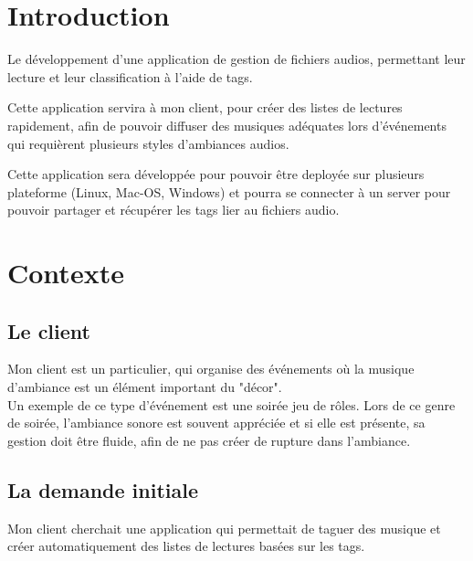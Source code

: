 \documentclass[a4paper,12pt]{report}
\author{Thomas Stassin}
\date{}
\begin{document}


\newpage
\thispagestyle{empty}
\addtocounter{page}{-1}
\null
\newpage



\tableofcontents
\pagebreak

\chapter{Introduction}

Le développement d'une application de gestion de fichiers audios, permettant leur lecture et leur classification à l'aide de tags.

Cette application servira à mon client, pour créer des listes de lectures rapidement, afin de pouvoir diffuser des musiques adéquates lors d'événements qui requièrent plusieurs styles d'ambiances audios.

Cette application sera développée pour pouvoir \^{e}tre deployée sur plusieurs plateforme (Linux, Mac-OS, Windows) et pourra se connecter à un server pour pouvoir partager et récupérer les tags lier au fichiers audio.

\chapter{Contexte}

\section{Le client}

Mon client est un particulier, qui organise des événements où la musique d'ambiance est un élément important du "décor". \\

Un exemple de ce type d'événement est une soirée jeu de r\^{o}les.
Lors de ce genre de soirée, l'ambiance sonore est souvent appréciée et si elle est présente, sa gestion doit \^{e}tre fluide, afin de ne pas créer de rupture dans l'ambiance.

\section{La demande initiale}
Mon client cherchait une application qui permettait de taguer des musique et créer automatiquement des listes de lectures basées sur les tags.\\
\end{document}
